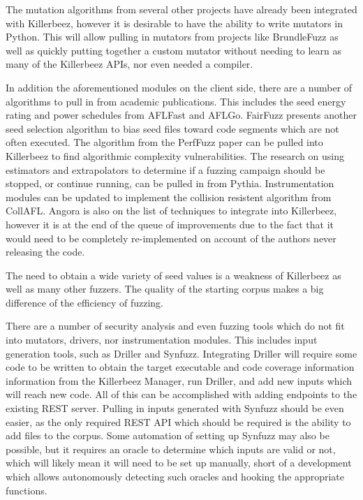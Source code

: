 The mutation algorithms from several other projects have already been
integrated with Killerbeez, however it is desirable to have the ability
to write mutators in Python.  This will allow pulling in mutators from
projects like BrundleFuzz\cite{brundlefuzz} as well as quickly putting
together a custom mutator without needing to learn as many of the Killerbeez
APIs, nor even needed a compiler.

In addition the aforementioned modules on the client side, there are a number
of algorithms to pull in from academic publications.  This includes the seed
energy rating and power schedules from AFLFast\cite{aflfast} and
AFLGo.\cite{aflgo} FairFuzz presents another seed selection algorithm to bias
seed files toward code segments which are not often executed.\cite{fairfuzz}
The algorithm from the PerfFuzz\cite{perffuzz} paper can be pulled into
Killerbeez to find algorithmic complexity vulnerabilities. The research on
using estimators and extrapolators to determine if a fuzzing campaign should
be stopped, or continue running, can be pulled in from Pythia.\cite{pythia}
Instrumentation modules can be updated to implement the collision resistent
algorithm from CollAFL.\cite{collafl} Angora is also on the list of techniques
to integrate into Killerbeez, however it is at the end of the queue of
improvements due to the fact that it would need to be completely re-implemented
on account of the authors never releasing the code.\cite{angora}

The need to obtain a wide variety of seed values is a weakness of Killerbeez
as well as many other fuzzers. The quality of the starting corpus makes a big
difference of the efficiency of fuzzing.

There are a number of security analysis and even fuzzing tools which do not
fit into mutators, drivers, nor instrumentation modules. This includes input
generation tools, such as Driller\cite{driller} and Synfuzz\cite{synfuzz}.
Integrating Driller will require some code to be written to obtain the target
executable and code coverage information information from the Killerbeez
Manager, run Driller, and add new inputs which will reach new code. All of this
can be accomplished with adding endpoints to the existing REST server. Pulling
in inputs generated with Synfuzz should be even easier, as the only required
REST API which should be required is the ability to add files to the corpus.
Some automation of setting up Synfuzz may also be possible, but it requires
an oracle to determine which inputs are valid or not, which will likely mean
it will need to be set up manually, short of a development which allows
autonomously detecting such oracles and hooking the appropriate functions.


